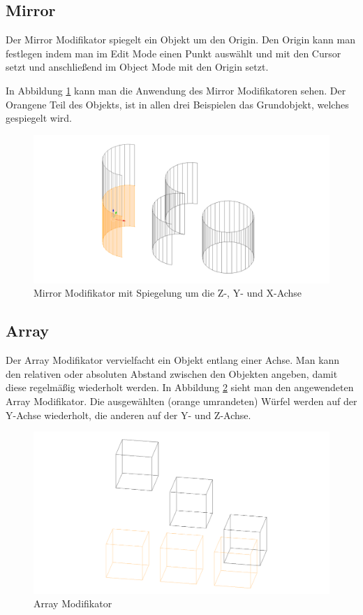 \subsection{Mirror}\citep{blender:mirror_modifier}
\label{Mirror:heading}
Der Mirror Modifikator spiegelt ein Objekt um den Origin.
Den Origin kann man festlegen indem man im Edit Mode einen Punkt auswählt
und mit   den Cursor setzt und anschließend im Object Mode mit 
 den Origin setzt.

In Abbildung \ref{modifikatoren:image2} kann man die Anwendung des Mirror Modifikatoren sehen. Der Orangene Teil des Objekts, ist in allen drei Beispielen das
Grundobjekt, welches gespiegelt wird.

\begin{figure}[h]
    \centering
    \includegraphics[width=.8\textwidth]{images/Modifikatoren-Mirror.png}
    \caption{Mirror Modifikator mit Spiegelung um die Z-, Y- und X-Achse}
    \label{modifikatoren:image2}
\end{figure}

\subsection{Array}\citep{blender:array_modifier}
\label{Array:heading}
Der Array Modifikator vervielfacht ein Objekt entlang einer Achse. Man kann den relativen oder absoluten Abstand zwischen den Objekten
angeben, damit diese regelmäßig wiederholt werden. In Abbildung \ref{modifikatoren:image3} sieht man den angewendeten Array Modifikator.
Die ausgewählten (orange umrandeten) Würfel werden auf der Y-Achse
wiederholt, die anderen auf der Y- und Z-Achse.
\begin{figure}[h]
    \centering
    \includegraphics[width=.8\textwidth]{images/Modifikatoren-Array.png}
    \caption{Array Modifikator}
    \label{modifikatoren:image3}
\end{figure}


